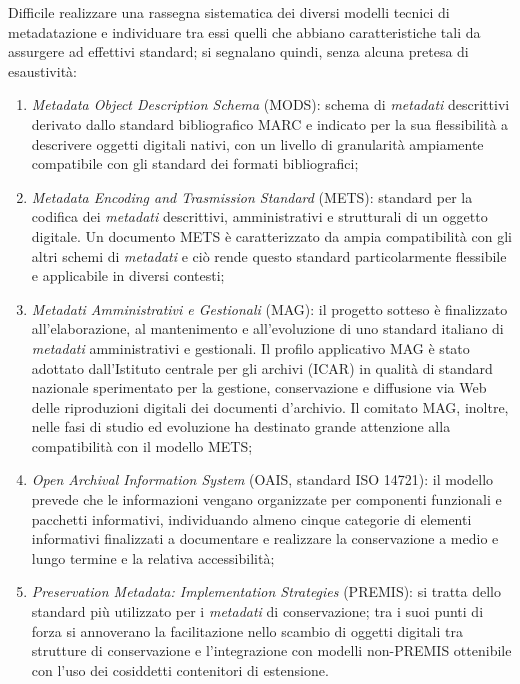 {Difficile realizzare una rassegna sistematica dei diversi modelli
tecnici di metadatazione e individuare tra essi quelli che abbiano
caratteristiche tali da assurgere ad effettivi standard; si segnalano
quindi, senza alcuna pretesa di esaustività:

\begin{enumerate}
\def\labelenumi{\arabic{enumi}.}
\item
  \emph{Metadata Object Description Schema} (MODS): schema di
  \emph{metadati} descrittivi derivato dallo standard bibliografico MARC
  e indicato per la sua flessibilità a descrivere oggetti digitali
  nativi, con un livello di granularità ampiamente compatibile con gli
  standard dei formati bibliografici;
\item
  \emph{Metadata Encoding and Trasmission Standard} (METS): standard per
  la codifica dei \emph{metadati} descrittivi, amministrativi e
  strutturali di un oggetto digitale. Un documento METS è caratterizzato
  da ampia compatibilità con gli altri schemi di \emph{metadati} e ciò
  rende questo standard particolarmente flessibile e applicabile in
  diversi contesti;
\item
  \emph{Metadati Amministrativi e Gestionali} (MAG): il progetto sotteso
  è finalizzato all'elaborazione, al mantenimento e all'evoluzione di
  uno standard italiano di \emph{metadati} amministrativi e gestionali.
  Il profilo applicativo MAG è stato adottato dall'Istituto centrale per
  gli archivi (ICAR) in qualità di standard nazionale sperimentato per
  la gestione, conservazione e diffusione via Web delle riproduzioni
  digitali dei documenti d'archivio. Il comitato MAG, inoltre, nelle
  fasi di studio ed evoluzione ha destinato grande attenzione alla
  compatibilità con il modello METS;
\item
  \emph{Open Archival Information System} (OAIS, standard ISO 14721): il
  modello prevede che le informazioni vengano organizzate per componenti
  funzionali e pacchetti informativi, individuando almeno cinque
  categorie di elementi informativi finalizzati a documentare e
  realizzare la conservazione a medio e lungo termine e la relativa
  accessibilità;
\item
  \emph{Preservation Metadata: Implementation Strategies} (PREMIS): si
  tratta dello standard più utilizzato per i \emph{metadati} di
  conservazione; tra i suoi punti di forza si annoverano la
  facilitazione nello scambio di oggetti digitali tra strutture di
  conservazione e l'integrazione con modelli non-PREMIS ottenibile con
  l'uso dei cosiddetti contenitori di estensione.
\end{enumerate}

}

